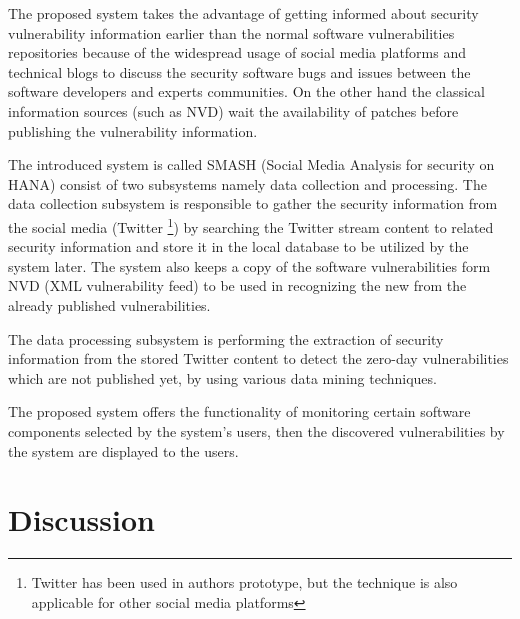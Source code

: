 \documentclass{llncs}
\begin{document}
The proposed system takes the advantage of getting informed about security vulnerability information earlier than the normal software vulnerabilities repositories because of the widespread usage of social media platforms and technical blogs to discuss the security software bugs and issues between the software developers and experts communities. On the other hand the classical information sources (such as NVD) wait the availability of patches before publishing the vulnerability information.

\par The introduced system is called SMASH (Social Media Analysis for security on HANA) consist of two subsystems namely data collection and processing. The data collection subsystem is responsible to gather the security information from the social media (Twitter \footnote{Twitter has been used in authors prototype, but the technique is also applicable for other social media platforms}) by searching the Twitter stream content to related security information and store it in the local database to be utilized by the system later. The system also keeps a copy of the software vulnerabilities form NVD (XML vulnerability feed) to be used in recognizing the new from the already published vulnerabilities.
\par
The data processing subsystem is performing the extraction of security information from the stored Twitter content to detect the zero-day vulnerabilities which are not published yet, by using various data mining techniques.

The proposed system offers the functionality of monitoring certain software components selected by the system's users, then the discovered vulnerabilities  by the system are displayed to the users.
  

\section{Discussion}
\end{document}
